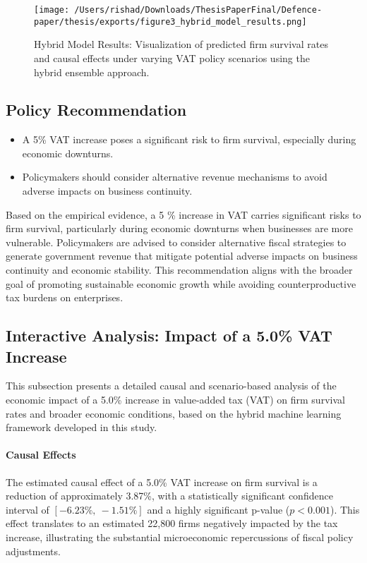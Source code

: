 \begin{figure}[H]
\centering
\texttt{[image: /Users/rishad/Downloads/ThesisPaperFinal/Defence-paper/thesis/exports/figure3\_hybrid\_model\_results.png]}
\caption{Hybrid Model Results: Visualization of predicted firm survival rates and causal effects under varying VAT policy scenarios using the hybrid ensemble approach.}
\label{fig:hybrid_model_results}
\end{figure}



\subsection{Policy Recommendation}

\begin{itemize}
  \item A 5\% VAT increase poses a significant risk to firm survival, especially during economic downturns.
  \item Policymakers should consider alternative revenue mechanisms to avoid adverse impacts on business continuity.
\end{itemize}
\vspace{0.5em}
\noindent
Based on the empirical evidence, a 5 \% increase in VAT carries significant risks to firm survival, particularly during economic downturns when businesses are more vulnerable. Policymakers are advised to consider alternative fiscal strategies to generate government revenue that mitigate potential adverse impacts on business continuity and economic stability. This recommendation aligns with the broader goal of promoting sustainable economic growth while avoiding counterproductive tax burdens on enterprises.

\subsection{Interactive Analysis: Impact of a 5.0\% VAT Increase}

This subsection presents a detailed causal and scenario-based analysis of the economic impact of a 5.0\% increase in value-added tax (VAT) on firm survival rates and broader economic conditions, based on the hybrid machine learning framework developed in this study.

\paragraph{Causal Effects}
The estimated causal effect of a 5.0\% VAT increase on firm survival is a reduction of approximately 3.87\%, with a statistically significant confidence interval of $[-6.23\%,\ -1.51\%]$ and a highly significant p-value ($p < 0.001$). This effect translates to an estimated 22,800 firms negatively impacted by the tax increase, illustrating the substantial microeconomic repercussions of fiscal policy adjustments.

